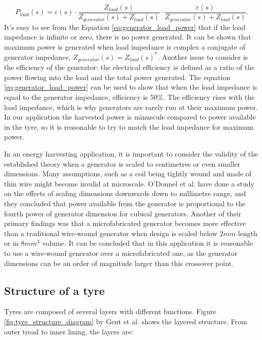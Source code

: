 \begin{equation} \label{eq:generator_load_power}
  P_{load}(s) = \varepsilon(s)  \cdot  \frac{Z_{load}(s)}{Z_{generator}(s)+Z_{load}(s)}  \cdot  \frac{\varepsilon(s)}{Z_{generator}(s)+Z_{load}(s)}.
\end{equation}
It's easy to see from the Equation \eqref{eq:generator_load_power} that if the load impedance is infinite or zero, there is no power generated. It can be shown that maximum power is generated when load impedance is complex a conjugate of generator impedance, $Z_{generator}(s) = {Z_{load}(s)}^*$. Another issue to consider is the efficiency of the generator: the electrical efficiency is defined as a ratio of the power flowing into the load and the total power generated. The equation \eqref{eq:generator_load_power} can be used to show that when the load impedance is equal to the generator impedance, efficiency is $ 50 \%$. The efficiency rises with the load impedance, which is why generators are rarely run at their maximum power. In our application the harvested power is minuscule compared to power available in the tyre, so it is reasonable to try to match the load impedance for maximum power.

In an energy harvesting application, it is important to consider the validity of the established theory when a generator is scaled to centimetres or even smaller dimensions. Many assumptions, such as a coil being tightly wound and made of thin wire might become invalid at microscale. O'Donnel et al. \cite{ODonnell2007} have done a study on the effects of scaling dimensions downwards down to millimetre range, and they concluded that power available from the generator is proportional to the fourth power of generator dimension for cubical generators. Another of their primary findings was that a microfabricated generator becomes more effective than a traditional wire-wound generator when design is scaled below $2 mm$ length or in $8 mm^3$ volume. It can be concluded that in this application it is reasonable to use a wire-wound generator over a microfabricated one, as the generator dimensions can be an order of magnitude larger than this crossover point. 


\subsection{Structure of a tyre}

Tyres are composed of several layers with different functions. Figure \ref{fig:tyre_structure_diagram} by Gent et al. \cite{Gent2005} shows the layered structure. From outer tread to inner lining, the layers are: 

